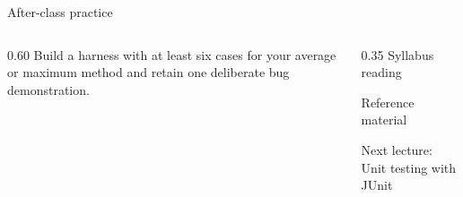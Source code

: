 \documentclass[10pt,aspectratio=169]{beamer}
\begin{document}
\begin{frame}[fragile,t]{After-class practice}
\begin{columns}[T,onlytextwidth]\begin{column}{0.60\textwidth}
Build a harness with at least six cases for your average or maximum method and retain one deliberate bug demonstration.
\end{column}\begin{column}{0.35\textwidth}\small
Syllabus reading\par Reference material

Next lecture: Unit testing with JUnit
\end{column}\end{columns}
\end{frame}
\end{document}
